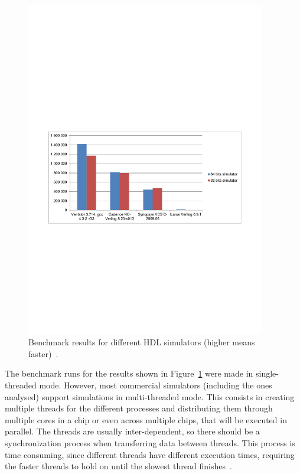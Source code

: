 \begin{figure}[!htb]
	\centering
	\includegraphics[trim=0 280 0 310 , clip, width=0.93\textwidth]{Figures/Performance.pdf}
	\caption{Benchmark results for different HDL simulators (higher means faster)~\cite{verilator:benchmarks}.}
	\label{fig:performance}
\end{figure}

The benchmark runs for the results shown in Figure~\ref{fig:performance} were
made in single-threaded mode. However, most commercial simulators (including the
ones analysed) support simulations in multi-threaded mode. This consists in
creating multiple threads for the different processes and distributing them
through multiple cores in a chip or even across multiple chips, that will be
executed in parallel. The threads are usually inter-dependent, so there should
be a synchronization process when transferring data between threads. This
process is time consuming, since different threads have different execution
times, requiring the faster threads to hold on until the slowest thread
finishes~\cite{tan:vhstas}.

